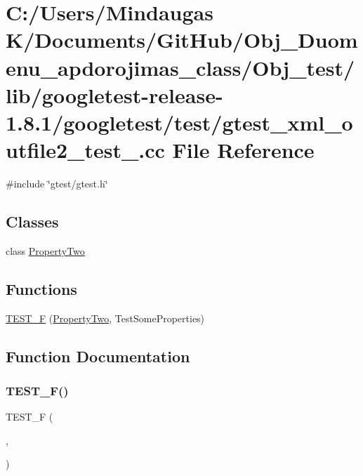 \hypertarget{_obj__test_2lib_2googletest-release-1_88_81_2googletest_2test_2gtest__xml__outfile2__test___8cc}{}\section{C\+:/\+Users/\+Mindaugas K/\+Documents/\+Git\+Hub/\+Obj\+\_\+\+Duomenu\+\_\+apdorojimas\+\_\+class/\+Obj\+\_\+test/lib/googletest-\/release-\/1.8.1/googletest/test/gtest\+\_\+xml\+\_\+outfile2\+\_\+test\+\_\+.cc File Reference}
\label{_obj__test_2lib_2googletest-release-1_88_81_2googletest_2test_2gtest__xml__outfile2__test___8cc}
{\ttfamily \#include \char`\"{}gtest/gtest.\+h\char`\"{}}\newline
\subsection*{Classes}
\begin{DoxyCompactItemize}
\item 
class \mbox{\hyperlink{class_property_two}{Property\+Two}}
\end{DoxyCompactItemize}
\subsection*{Functions}
\begin{DoxyCompactItemize}
\item 
\mbox{\hyperlink{_obj__test_2lib_2googletest-release-1_88_81_2googletest_2test_2gtest__xml__outfile2__test___8cc_a40b5d77ad85226c30fc3aa4f1e4f7bb5}{T\+E\+S\+T\+\_\+F}} (\mbox{\hyperlink{class_property_two}{Property\+Two}}, Test\+Some\+Properties)
\end{DoxyCompactItemize}


\subsection{Function Documentation}
\mbox{\label{_obj__test_2lib_2googletest-release-1_88_81_2googletest_2test_2gtest__xml__outfile2__test___8cc_a40b5d77ad85226c30fc3aa4f1e4f7bb5}} 
\subsubsection{\texorpdfstring{TEST\_F()}{TEST\_F()}}
{\footnotesize\ttfamily T\+E\+S\+T\+\_\+F (\begin{DoxyParamCaption}\item[{\mbox{\hyperlink{class_property_two}{Property\+Two}}}]{,  }\item[{Test\+Some\+Properties}]{ }\end{DoxyParamCaption})}

